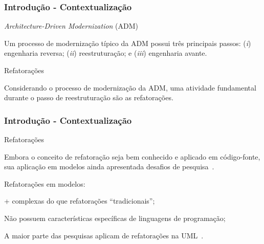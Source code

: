 \documentclass{beamer}
\begin{document}
\begin{frame}\frametitle{Introdução - Contextualização}

\begin{block}{\textit{Architecture-Driven Modernization} (ADM)}
\begin{minipage}[b]{10.80cm}
Um processo de modernização típico da ADM possui três principais passos: (\textit{i}) engenharia reversa; (\textit{ii}) reestruturação; e (\textit{iii}) engenharia avante.
\end{minipage}  
\end{block}

\begin{block}{Refatorações}
\begin{minipage}[b]{10.80cm}
Considerando o processo de modernização da ADM, uma atividade fundamental durante o passo de reestruturação são as refatorações.
\end{minipage}  
\end{block}


\end{frame}

\begin{frame}\frametitle{Introdução - Contextualização}

\begin{block}{Refatorações}
\begin{minipage}[b]{10.80cm}
Embora o conceito de refatoração seja bem conhecido e aplicado em código-fonte, sua aplicação em modelos ainda apresentada desafios de pesquisa~\cite{Gorp}.
\end{minipage}  
\end{block}

Refatorações em modelos:

\begin{itemize}
  \begin{minipage}[b]{9.8cm}  
  \item + complexas do que refatorações ``tradicionais'';
  \vspace{.4cm}\end{minipage}
  \begin{minipage}[b]{9.8cm} 
  \item  Não possuem características específicas de linguagens de programação;
  \vspace{.4cm}\end{minipage}
  \begin{minipage}[b]{9.8cm} 
  \item  A maior parte das pesquisas aplicam de refatorações na UML~\cite{Salem_2008, revisao_sistematica_uml_refactoring}.
  \vspace{.4cm}\end{minipage}
\end{itemize}


\end{frame}
\end{document}
